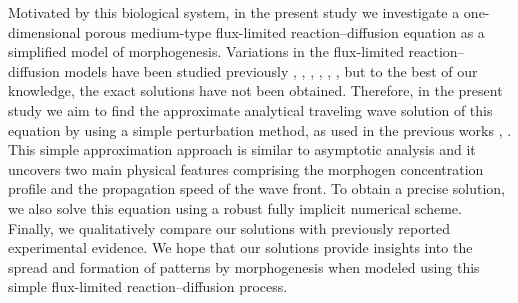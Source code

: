 \documentclass[jkps,preprint,fleqn,showpacs,showkeys]{revtex4}
\begin{document}
Motivated by this biological system, in the present study we investigate a one-dimensional porous medium-type flux-limited reaction--diffusion equation as a simplified model of morphogenesis. Variations in the flux-limited reaction--diffusion models have been studied previously \cite{Kurganov2006onreaction}, \cite{Andreu2010AFisher}, \cite{Campos2013ontheanalysis}, \cite{Garrione2015monotone}, \cite{Calvo2016pattern}, \cite{Campos2016}, but to the best of our knowledge, the exact solutions have not been obtained. Therefore, in the present study we aim to find the approximate analytical traveling wave solution of this equation by using a simple perturbation method, as used in the previous works \cite{Sanchezgarduno1994}, \cite{Ngamsaad2016}. This simple approximation approach is similar to asymptotic analysis \cite{Murray1989} and it uncovers two main physical features comprising the morphogen concentration profile and the propagation speed of the wave front. To obtain a precise solution, we also solve this equation using a robust fully implicit numerical scheme. Finally, we qualitatively compare our solutions with previously reported experimental evidence. We hope that our solutions provide insights into the spread and formation of patterns by morphogenesis when modeled using this simple flux-limited reaction--diffusion process. 


\end{document}
